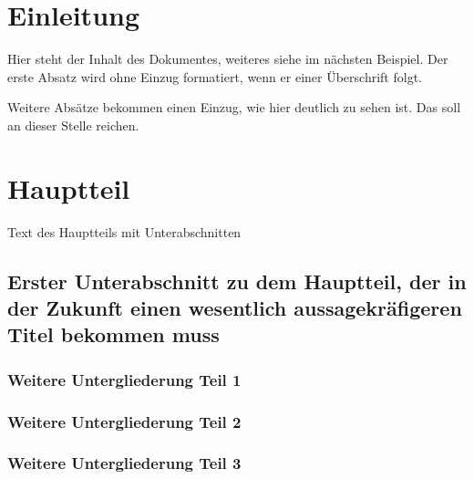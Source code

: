 \documentclass[ngerman]{scrbook}      %
\begin{document}
  \mainmatter            %
  
  \chapter{Einleitung}   %

  Hier steht der Inhalt des Dokumentes, weiteres siehe im n\"achsten
  Beispiel. Der erste Absatz wird ohne Einzug formatiert, wenn er einer \"Uberschrift folgt.
  
  Weitere Absätze bekommen einen Einzug, wie hier deutlich zu sehen ist.
  Das soll an dieser Stelle reichen.
  
  \chapter{Hauptteil}
  
  Text des Hauptteils mit Unterabschnitten
  
  \section[Erster Unterabschnitt]{Erster Unterabschnitt zu
dem Hauptteil, der in der Zukunft einen wesentlich aussagekräfigeren
Titel bekommen muss}

  \subsection{Weitere Untergliederung Teil 1}
  \subsection{Weitere Untergliederung Teil 2}
  \subsection{Weitere Untergliederung Teil 3}
\end{document}
